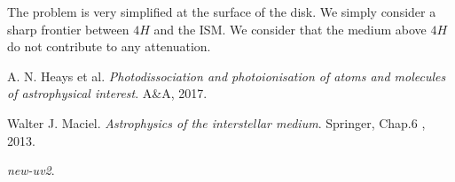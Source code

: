 \documentclass[a4paper]{article}
\begin{document}
\noindent The problem is very simplified at the surface of the disk. We simply consider a sharp frontier between $4H$ and the ISM. We consider that the medium above $4H$ do not contribute to any attenuation. 













\newpage 
\begin{thebibliography}{9}

A. N. Heays et al. 
\textit{Photodissociation and photoionisation of atoms and molecules
of astrophysical interest}. 
A\&A, 2017.
 
Walter J. Maciel. 
\textit{Astrophysics of the interstellar medium}. 
Springer, Chap.6 , 2013.


\textit{new-uv2}. 


\end{thebibliography}
\end{document}
